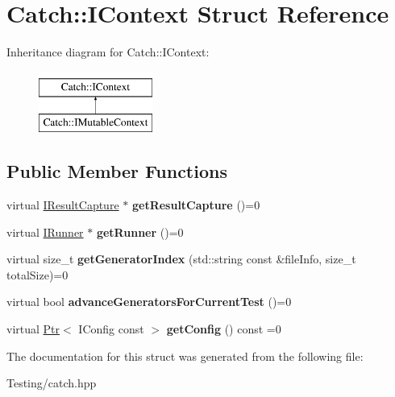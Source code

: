 \hypertarget{struct_catch_1_1_i_context}{\section{Catch\-:\-:I\-Context Struct Reference}
\label{struct_catch_1_1_i_context}
}
Inheritance diagram for Catch\-:\-:I\-Context\-:\begin{figure}[H]
\begin{center}
\leavevmode
\includegraphics[height=2.000000cm]{struct_catch_1_1_i_context}
\end{center}
\end{figure}
\subsection*{Public Member Functions}
\begin{DoxyCompactItemize}
\item 
\hypertarget{struct_catch_1_1_i_context_a684e4ae71d1fdf3060c352ecde1d122f}{virtual \hyperlink{struct_catch_1_1_i_result_capture}{I\-Result\-Capture} $\ast$ {\bfseries get\-Result\-Capture} ()=0}\label{struct_catch_1_1_i_context_a684e4ae71d1fdf3060c352ecde1d122f}

\item 
\hypertarget{struct_catch_1_1_i_context_af088415dde18d039ed5a2f95b02767c6}{virtual \hyperlink{struct_catch_1_1_i_runner}{I\-Runner} $\ast$ {\bfseries get\-Runner} ()=0}\label{struct_catch_1_1_i_context_af088415dde18d039ed5a2f95b02767c6}

\item 
\hypertarget{struct_catch_1_1_i_context_a43e07088db43299ba129fbe6d3106e95}{virtual size\-\_\-t {\bfseries get\-Generator\-Index} (std\-::string const \&file\-Info, size\-\_\-t total\-Size)=0}\label{struct_catch_1_1_i_context_a43e07088db43299ba129fbe6d3106e95}

\item 
\hypertarget{struct_catch_1_1_i_context_a806f7c4ed24d51adae90418e661b24b7}{virtual bool {\bfseries advance\-Generators\-For\-Current\-Test} ()=0}\label{struct_catch_1_1_i_context_a806f7c4ed24d51adae90418e661b24b7}

\item 
\hypertarget{struct_catch_1_1_i_context_aee81c415899262e096ad8d6f686fa365}{virtual \hyperlink{class_catch_1_1_ptr}{Ptr}$<$ I\-Config const  $>$ {\bfseries get\-Config} () const =0}\label{struct_catch_1_1_i_context_aee81c415899262e096ad8d6f686fa365}

\end{DoxyCompactItemize}


The documentation for this struct was generated from the following file\-:\begin{DoxyCompactItemize}
\item 
Testing/catch.\-hpp\end{DoxyCompactItemize}
